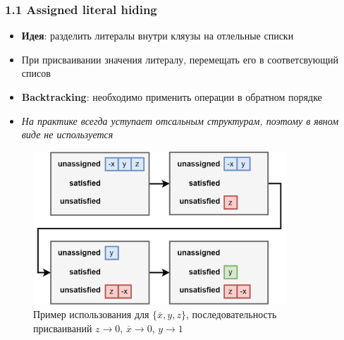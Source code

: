 \documentclass[aspectratio=169,xcolor=table,english]{beamer}
\begin{document}
\begin{frame}[fragile] \frametitle{1.1 Assigned literal hiding}
    \begin{minipage}[m]{0.5\linewidth}
        \begin{itemize}
            \item \textbf{Идея}: разделить литералы внутри кляузы на отлельные списки
            \item При присваивании значения литералу, перемещать его в соответсвующий списов
            \item \textbf{Backtracking}: необходимо применить операции в обратном порядке
            \item \textit{На практике всегда уступает отсальным структурам, поэтому в явном виде не используется}
        \end{itemize}
    \end{minipage}\hfill
    \begin{minipage}[m]{0.45\linewidth}
        \begin{figure}
            \centering
            \includegraphics[width=0.85\textwidth]{figures/assigned lit hiding.png}
            \caption{Пример использования для $\{\overline{x},y,z\}$, последовательность присваиваний $z \rightarrow 0$, $\overline{x} \rightarrow 0$, $y \rightarrow 1$}
        \end{figure}
    \end{minipage}
\end{frame}
\end{document}

